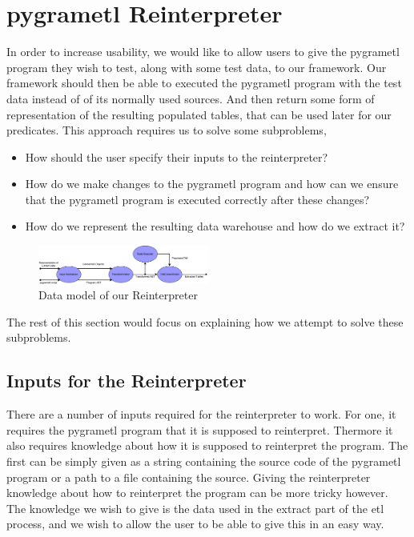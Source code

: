 \section{pygrametl Reinterpreter}
In order to increase usability, we would like to allow users to give the pygrametl program they wish to test, along with some test data, to our framework. Our framework should then be able to executed the pygrametl program with the test data instead of of its normally used sources. And then return some form of representation of the resulting populated tables, that can be used later for our predicates. This approach requires us to solve some subproblems,

\begin{itemize}
\item How should the user specify their inputs to the reinterpreter?
\item How do we make changes to the pygrametl program and how can we ensure that the pygrametl program is executed correctly after these changes? 
\item How do we represent the resulting data warehouse and how do we extract it?
\end{itemize}

\begin{figure}
  \centering
  \includegraphics[width=0.5\textwidth]{figures/reinterpreter_model.pdf}
  \caption{Data model of our Reinterpreter}
\end{figure}

The rest of this section would focus on explaining how we attempt to solve these subproblems.

\subsection{Inputs for the Reinterpreter}
There are a number of inputs required for the reinterpreter to work. For one, it requires the pygrametl program that it is supposed to reinterpret. Thermore it also requires knowledge about how it is supposed to reinterpret the program. The first can be simply given as a string containing the source code of the pygrametl program or a path to a file containing the source. Giving the reinterpreter knowledge about how to reinterpret the program can be more tricky however. The knowledge we wish to give is the data used in the extract part of the etl process, and we wish to allow the user to be able to give this in an easy way. 

